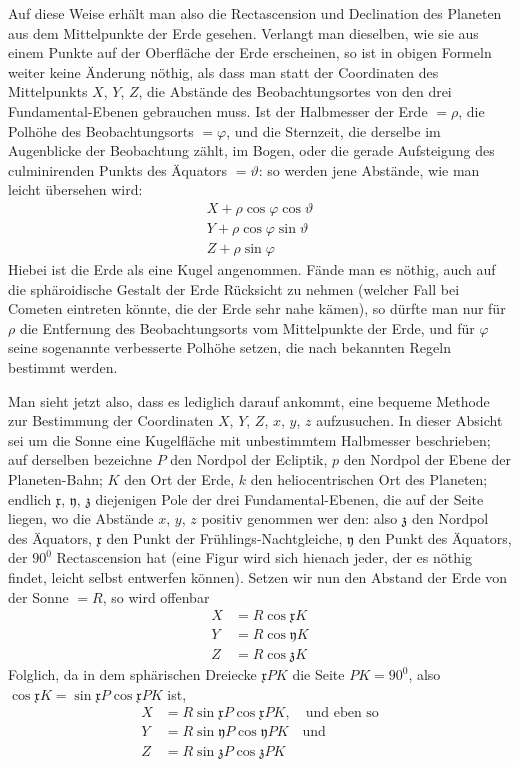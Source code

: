 Auf diese Weise erhält man also die Rectascension und Declination des
Planeten aus dem Mittelpunkte der Erde gesehen. Verlangt man dieselben, wie
sie aus einem Punkte auf der Oberfläche der Erde erscheinen, so ist in obigen
Formeln weiter keine Änderung nöthig, als dass man statt der Coordinaten des
Mittelpunkts $X$, $Y$, $Z$, die Abstände des Beobachtungsortes von den drei Fundamental-Ebenen
gebrauchen muss. Ist der Halbmesser der Erde $=\rho$, die
Polhöhe des Beobachtungsorts $=\varphi$, und die Sternzeit, die derselbe im Augenblicke
der Beobachtung zählt, im Bogen, oder die gerade Aufsteigung des culminirenden
Punkts des Äquators $=\vartheta$: so werden jene Abstände, wie man leicht
übersehen wird:
\[
\begin{gathered}
X+\rho\cos\varphi\cos\vartheta\\
Y+\rho\cos\varphi\sin\vartheta\\
Z+\rho\sin\varphi
\end{gathered}
\]
Hiebei ist die Erde als eine Kugel angenommen. Fände man es nöthig, auch
auf die sphäroidische Gestalt der Erde Rücksicht zu nehmen (welcher Fall bei
Cometen eintreten könnte, die der Erde sehr nahe kämen), so dürfte man nur
für $\rho$ die Entfernung des Beobachtungsorts vom Mittelpunkte der Erde, und für
$\varphi$ seine sogenannte verbesserte Polhöhe setzen, die nach bekannten Regeln bestimmt
werden.

Man sieht jetzt also, dass es lediglich darauf ankommt, eine bequeme Methode
zur Bestimmung der Coordinaten $X$, $Y$, $Z$, $x$, $y$, $z$ aufzusuchen. In dieser
Absicht sei um die Sonne eine Kugelfläche mit unbestimmtem Halbmesser
beschrieben; auf derselben bezeichne $P$ den Nordpol der Ecliptik, $p$ den Nordpol
der Ebene der Planeten-Bahn; $K$ den Ort der Erde, $k$ den heliocentrischen
Ort des Planeten; endlich $\mathfrak{x}$, $\mathfrak{y}$, $\mathfrak{z}$ diejenigen Pole der drei Fundamental-Ebenen,
die auf der Seite liegen, wo die Abstände $x$, $y$, $z$ positiv genommen wer%
den: also $\mathfrak{z}$ den Nordpol des Äquators, $\mathfrak{x}$ den Punkt der Frühlings-Nachtgleiche,
$\mathfrak{y}$ den Punkt des Äquators, der $90^0$ Rectascension hat (eine Figur wird
sich hienach jeder, der es nöthig findet, leicht selbst entwerfen können). Setzen
wir nun den Abstand der Erde von der Sonne $=R$, so wird offenbar
\[
\begin{aligned}
X&=R\cos\mathfrak{x}K\\
Y&=R\cos\mathfrak{y}K\\
Z&=R\cos\mathfrak{z}K
\end{aligned}
\]
Folglich, da in dem sphärischen Dreiecke $\mathfrak{x}PK$ die Seite $PK=90^0$, also
$\cos\mathfrak{x}K=\sin\mathfrak{x}P\cos\mathfrak{x}PK$ ist,
\[
\begin{aligned}
X&=R\sin\mathfrak{x}P\cos\mathfrak{x}PK,\quad\text{und eben so}\\
Y&=R\sin\mathfrak{y}P\cos\mathfrak{y}PK\quad\text{und}\\
Z&=R\sin\mathfrak{z}P\cos\mathfrak{z}PK
\end{aligned}
\]

